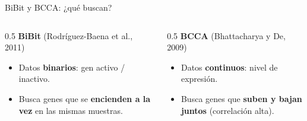 \documentclass[10pt,aspectratio=169]{beamer}
\begin{document}
\begin{frame}{BiBit y BCCA: ¿qué buscan?}
    \begin{columns}[T]
        \begin{column}{0.5\textwidth}
            \textbf{BiBit} {\footnotesize(Rodríguez-Baena et al., 2011)}
            \begin{itemize}
                \item Datos \textbf{binarios}: gen activo / inactivo.
                \item Busca genes que se \textbf{encienden a la vez} en las mismas muestras.
            \end{itemize}
        \end{column}
        \begin{column}{0.5\textwidth}
            \textbf{BCCA} {\footnotesize(Bhattacharya y De, 2009)}
            \begin{itemize}
                \item Datos \textbf{continuos}: nivel de expresión.
                \item Busca genes que \textbf{suben y bajan juntos} (correlación alta).
            \end{itemize}
        \end{column}
    \end{columns}
\end{frame}
\end{document}
